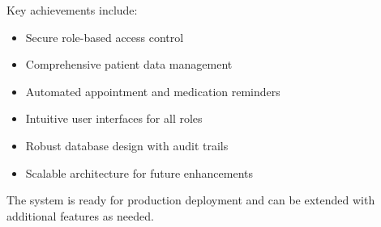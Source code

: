 \documentclass[12pt,a4paper]{article}
\begin{document}
Key achievements include:
\begin{itemize}
    \item Secure role-based access control
    \item Comprehensive patient data management
    \item Automated appointment and medication reminders
    \item Intuitive user interfaces for all roles
    \item Robust database design with audit trails
    \item Scalable architecture for future enhancements
\end{itemize}

The system is ready for production deployment and can be extended with additional features as needed.
\end{document}
